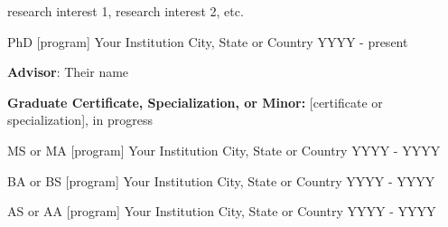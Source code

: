 

 \begin{small} \color{black} 
research interest 1, research interest 2, etc. 
\end{small}




\begin{cventries}

  \cventry
    {PhD [program]} %
    {Your Institution} %
    {City, State or Country} %
    {YYYY - present} %
    {
      \begin{cvitems} %
              \item {\textbf{Advisor}: Their name}
                \item {\textbf{Graduate Certificate, Specialization, or Minor:} [certificate or specialization], in progress}
      \end{cvitems}
    }

  \cventry
    {MS or MA [program]} %
    {Your Institution} %
    {City, State or Country} %
    {YYYY - YYYY} %
    {
    }
    
\cventry
    {BA or BS [program]} %
    {Your Institution} %
    {City, State or Country} %
    {YYYY - YYYY} %
    {
    }

  \cventry
    {AS or AA [program]} %
    {Your Institution} %
    {City, State or Country} %
    {YYYY - YYYY} %
{
    }
\end{cventries}
